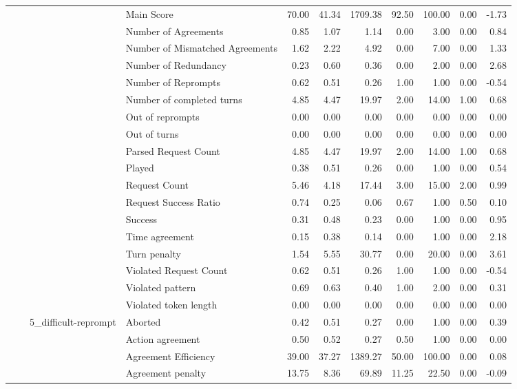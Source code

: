 \begin{tabular}{llllrrrrrrr}
 &  &  & Main Score & 70.00 & 41.34 & 1709.38 & 92.50 & 100.00 & 0.00 & -1.73 \\
 &  &  & Number of Agreements & 0.85 & 1.07 & 1.14 & 0.00 & 3.00 & 0.00 & 0.84 \\
 &  &  & Number of Mismatched Agreements & 1.62 & 2.22 & 4.92 & 0.00 & 7.00 & 0.00 & 1.33 \\
 &  &  & Number of Redundancy & 0.23 & 0.60 & 0.36 & 0.00 & 2.00 & 0.00 & 2.68 \\
 &  &  & Number of Reprompts & 0.62 & 0.51 & 0.26 & 1.00 & 1.00 & 0.00 & -0.54 \\
 &  &  & Number of completed turns & 4.85 & 4.47 & 19.97 & 2.00 & 14.00 & 1.00 & 0.68 \\
 &  &  & Out of reprompts & 0.00 & 0.00 & 0.00 & 0.00 & 0.00 & 0.00 & 0.00 \\
 &  &  & Out of turns & 0.00 & 0.00 & 0.00 & 0.00 & 0.00 & 0.00 & 0.00 \\
 &  &  & Parsed Request Count & 4.85 & 4.47 & 19.97 & 2.00 & 14.00 & 1.00 & 0.68 \\
 &  &  & Played & 0.38 & 0.51 & 0.26 & 0.00 & 1.00 & 0.00 & 0.54 \\
 &  &  & Request Count & 5.46 & 4.18 & 17.44 & 3.00 & 15.00 & 2.00 & 0.99 \\
 &  &  & Request Success Ratio & 0.74 & 0.25 & 0.06 & 0.67 & 1.00 & 0.50 & 0.10 \\
 &  &  & Success & 0.31 & 0.48 & 0.23 & 0.00 & 1.00 & 0.00 & 0.95 \\
 &  &  & Time agreement & 0.15 & 0.38 & 0.14 & 0.00 & 1.00 & 0.00 & 2.18 \\
 &  &  & Turn penalty & 1.54 & 5.55 & 30.77 & 0.00 & 20.00 & 0.00 & 3.61 \\
 &  &  & Violated Request Count & 0.62 & 0.51 & 0.26 & 1.00 & 1.00 & 0.00 & -0.54 \\
 &  &  & Violated pattern & 0.69 & 0.63 & 0.40 & 1.00 & 2.00 & 0.00 & 0.31 \\
 &  &  & Violated token length & 0.00 & 0.00 & 0.00 & 0.00 & 0.00 & 0.00 & 0.00 \\
\cline{3-11}
 &  & \multirow[t]{27}{*}{5_difficult-reprompt} & Aborted & 0.42 & 0.51 & 0.27 & 0.00 & 1.00 & 0.00 & 0.39 \\
 &  &  & Action agreement & 0.50 & 0.52 & 0.27 & 0.50 & 1.00 & 0.00 & 0.00 \\
 &  &  & Agreement Efficiency & 39.00 & 37.27 & 1389.27 & 50.00 & 100.00 & 0.00 & 0.08 \\
 &  &  & Agreement penalty & 13.75 & 8.36 & 69.89 & 11.25 & 22.50 & 0.00 & -0.09 \\

\end{tabular}

